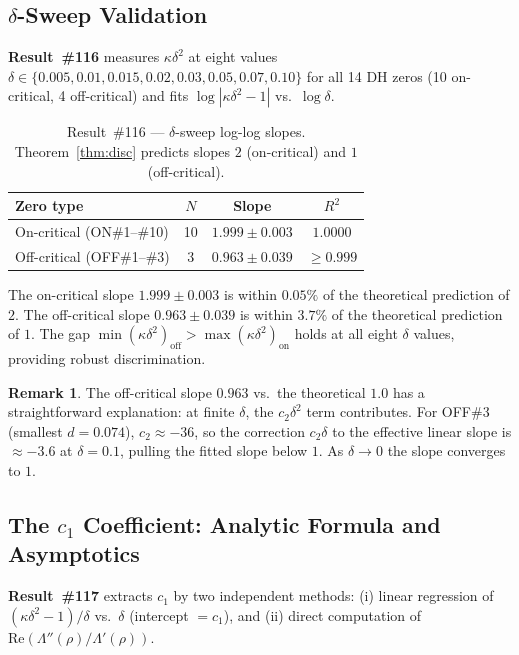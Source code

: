 \documentclass[11pt, a4paper]{article}
\theoremstyle{plain}
\theoremstyle{definition}
\newtheorem{remark}{Remark}[section]
\begin{document}
\subsection{$\delta$-Sweep Validation}
\label{ssec:sweep}

\textbf{Result~\#116} measures $\kappa\delta^{2}$ at eight values
$\delta\in\{0.005,0.01,0.015,0.02,0.03,0.05,0.07,0.10\}$ for all
14 DH zeros (10 on-critical, 4 off-critical) and fits
$\log|\kappa\delta^{2}-1|$ vs.\ $\log\delta$.

\begin{table}[ht]
\centering
\caption{Result~\#116 — $\delta$-sweep log-log slopes.
  Theorem~\ref{thm:disc} predicts slopes $2$ (on-critical) and $1$ (off-critical).}
\label{tab:sweep116}
\small
\begin{tabular}{lccc}
\toprule
Zero type & $N$ & Slope & $R^{2}$ \\
\midrule
On-critical  (ON\#1--\#10)  & 10 & $1.999\pm 0.003$ & $1.0000$ \\
Off-critical (OFF\#1--\#3)  & 3  & $0.963\pm 0.039$ & $\geq 0.999$ \\
\bottomrule
\end{tabular}
\end{table}

The on-critical slope $1.999\pm0.003$ is within $0.05\%$ of the
theoretical prediction of $2$.  The off-critical slope $0.963\pm0.039$
is within $3.7\%$ of the theoretical prediction of $1$.  The gap
$\min(\kappa\delta^{2})_{\text{off}} > \max(\kappa\delta^{2})_{\text{on}}$
holds at all eight $\delta$ values, providing robust discrimination.

\begin{remark}
  The off-critical slope $0.963$ vs.\ the theoretical $1.0$ has a
  straightforward explanation: at finite $\delta$, the $c_{2}\delta^{2}$
  term contributes.  For OFF\#3 (smallest $d=0.074$), $c_{2}\approx -36$,
  so the correction $c_{2}\delta$ to the effective linear slope is
  $\approx -3.6$ at $\delta=0.1$, pulling the fitted slope below $1$.
  As $\delta\to 0$ the slope converges to $1$.
\end{remark}


\subsection{The $c_{1}$ Coefficient: Analytic Formula and Asymptotics}
\label{ssec:c1}

\textbf{Result~\#117} extracts $c_{1}$ by two independent methods:
(i) linear regression of $(\kappa\delta^{2}-1)/\delta$ vs.\ $\delta$
(intercept $= c_{1}$), and (ii) direct computation of
$\mathrm{Re}(\Lambda''(\rho)/\Lambda'(\rho))$.
\end{document}
